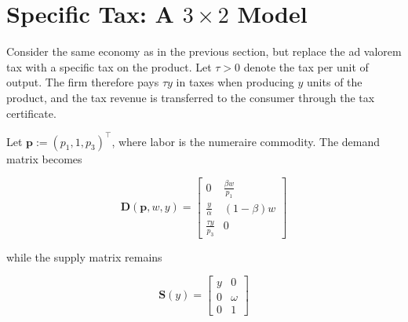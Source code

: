 \documentclass[
  letterpaper,
  DIV=11,
  numbers=noendperiod]{scrreprt}
\newenvironment{Shaded}{\begin{snugshade}}{\end{snugshade}}
\newcommand{\ConstantTok}[1]{\textcolor[rgb]{0.56,0.35,0.01}{#1}}
\newcommand{\FloatTok}[1]{\textcolor[rgb]{0.68,0.00,0.00}{#1}}
\newcommand{\FunctionTok}[1]{\textcolor[rgb]{0.28,0.35,0.67}{#1}}
\newcommand{\NormalTok}[1]{\textcolor[rgb]{0.00,0.23,0.31}{#1}}
\newcommand{\OperatorTok}[1]{\textcolor[rgb]{0.37,0.37,0.37}{#1}}
\begin{document}
%

\section{\texorpdfstring{Specific Tax: A \(3\times2\)
Model}{Specific Tax: A 3\textbackslash times2 Model}}\label{specific-tax-a-3times2-model}

Consider the same economy as in the previous section, but replace the ad
valorem tax with a specific tax on the product. Let \(\tau>0\) denote
the tax per unit of output. The firm therefore pays \(\tau y\) in taxes
when producing \(y\) units of the product, and the tax revenue is
transferred to the consumer through the tax certificate.

Let \(\mathbf p:=(p_1,1,p_3)^\top\), where labor is the numeraire
commodity. The demand matrix becomes

\[
\mathbf D(\mathbf p,w,y)
=
\begin{bmatrix}
0 & \frac{\beta w}{p_1}\\
\frac{y}{\alpha} & (1-\beta)w\\
\frac{\tau y}{p_3} & 0
\end{bmatrix}
\]

while the supply matrix remains

\[
\mathbf S(y)
=
\begin{bmatrix}
y & 0\\
0 & \omega\\
0 & 1
\end{bmatrix}
\]
\end{document}
